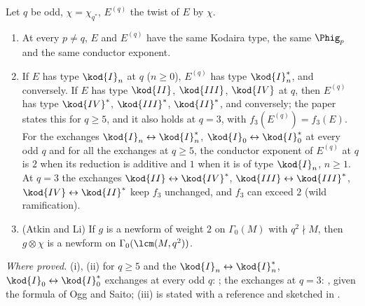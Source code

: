 \begin{sloppypar}
\begin{lemma}[the paper's Lemma lem:twist, with the exchanges at $q=3$]\label{lem:paper:twist}
Let $q$ be odd, $\chi=\chi_{q^*}$, $E^{(q)}$ the twist of $E$ by $\chi$.
\begin{enumerate}[label=(\roman*)]
\item At every $p\ne q$, $E$ and $E^{(q)}$ have the same Kodaira type, the same $\Phig_p$ and the same conductor exponent.
\item If $E$ has type $\kod{I}_n$ at $q$ ($n\ge0$), $E^{(q)}$ has type $\kod{I}_n^*$, and conversely. If $E$ has type $\kod{II}$, $\kod{III}$, $\kod{IV}$ at $q$, then $E^{(q)}$ has type $\kod{IV}^*$,
$\kod{III}^*$, $\kod{II}^*$, and conversely; the paper states this for $q\ge5$, and it also holds at $q=3$, with $f_3(E^{(q)})=f_3(E)$. For the exchanges
$\kod{I}_n\leftrightarrow\kod{I}_n^*$, $\kod{I}_0\leftrightarrow\kod{I}_0^*$ at every odd $q$ and for all the exchanges at $q\ge5$, the conductor exponent of $E^{(q)}$ at $q$ is $2$ when its reduction is
additive and $1$ when it is of type $\kod{I}_n$, $n\ge1$. At $q=3$ the exchanges $\kod{II}\leftrightarrow\kod{IV}^*$, $\kod{III}\leftrightarrow\kod{III}^*$, $\kod{IV}\leftrightarrow\kod{II}^*$ keep $f_3$
unchanged, and $f_3$ can exceed $2$ (wild ramification).
\item (Atkin and Li) If $g$ is a newform of weight $2$ on $\Gamma_0(M)$ with $q^2\nmid M$, then $g\otimes\chi$ is a newform on $\Gamma_0(\lcm(M,q^2))$.
\end{enumerate}
\end{lemma}

\noindent\emph{Where proved.} (i), (ii) for $q\ge5$ and the $\kod{I}_n\leftrightarrow\kod{I}_n^*$, $\kod{I}_0\leftrightarrow\kod{I}_0^*$ exchanges at every odd $q$: ; the exchanges at $q=3$:
, given the formula of Ogg and Saito; (iii) is stated with a reference \cite[Theorem 3.1]{AtkinLi78} and sketched in .


\end{sloppypar}
